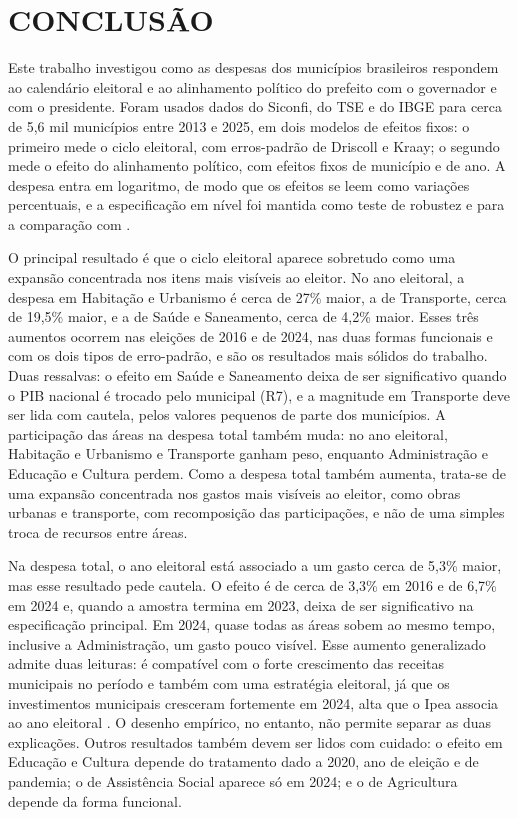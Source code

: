 
\chapter{CONCLUSÃO}\label{cap:conclusao}

Este trabalho investigou como as despesas dos municípios brasileiros respondem ao calendário eleitoral e ao alinhamento político do prefeito com o governador e com o presidente. Foram usados dados do Siconfi, do TSE e do IBGE para cerca de 5,6 mil municípios entre 2013 e 2025, em dois modelos de efeitos fixos: o primeiro mede o ciclo eleitoral, com erros-padrão de Driscoll e Kraay; o segundo mede o efeito do alinhamento político, com efeitos fixos de município e de ano. A despesa entra em logaritmo, de modo que os efeitos se leem como variações percentuais, e a especificação em nível foi mantida como teste de robustez e para a comparação com \textcite{sakurai2009}.

O principal resultado é que o ciclo eleitoral aparece sobretudo como uma expansão concentrada nos itens mais visíveis ao eleitor. No ano eleitoral, a despesa em Habitação e Urbanismo é cerca de 27\% maior, a de Transporte, cerca de 19,5\% maior, e a de Saúde e Saneamento, cerca de 4,2\% maior. Esses três aumentos ocorrem nas eleições de 2016 e de 2024, nas duas formas funcionais e com os dois tipos de erro-padrão, e são os resultados mais sólidos do trabalho. Duas ressalvas: o efeito em Saúde e Saneamento deixa de ser significativo quando o PIB nacional é trocado pelo municipal (R7), e a magnitude em Transporte deve ser lida com cautela, pelos valores pequenos de parte dos municípios. A participação das áreas na despesa total também muda: no ano eleitoral, Habitação e Urbanismo e Transporte ganham peso, enquanto Administração e Educação e Cultura perdem. Como a despesa total também aumenta, trata-se de uma expansão concentrada nos gastos mais visíveis ao eleitor, como obras urbanas e transporte, com recomposição das participações, e não de uma simples troca de recursos entre áreas.

Na despesa total, o ano eleitoral está associado a um gasto cerca de 5,3\% maior, mas esse resultado pede cautela. O efeito é de cerca de 3,3\% em 2016 e de 6,7\% em 2024 e, quando a amostra termina em 2023, deixa de ser significativo na especificação principal. Em 2024, quase todas as áreas sobem ao mesmo tempo, inclusive a Administração, um gasto pouco visível. Esse aumento generalizado admite duas leituras: é compatível com o forte crescimento das receitas municipais no período e também com uma estratégia eleitoral, já que os investimentos municipais cresceram fortemente em 2024, alta que o Ipea associa ao ano eleitoral \parencite{santana2025}. O desenho empírico, no entanto, não permite separar as duas explicações. Outros resultados também devem ser lidos com cuidado: o efeito em Educação e Cultura depende do tratamento dado a 2020, ano de eleição e de pandemia; o de Assistência Social aparece só em 2024; e o de Agricultura depende da forma funcional.

